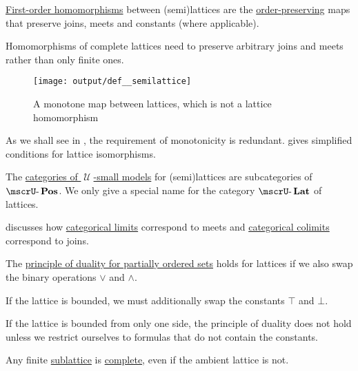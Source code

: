 \begin{definition}
\begin{thmenum}[resume=def:semilattice]
     \hyperref[def:first_order_homomorphism]{First-order homomorphisms} between (semi)lattices are the \hyperref[def:order_homomorphism/increasing]{order-preserving} maps that preserve joins, meets and constants (where applicable).

    Homomorphisms of complete lattices need to preserve arbitrary joins and meets rather than only finite ones.

    \begin{figure}[!ht]
      \centering
      \texttt{[image: output/def\_\_semilattice]}
      \caption{A monotone map between lattices, which is not a lattice homomorphism}
      \label{fig:def:semilattice/homomorphism/monotone_map_not_homomorphism}
    \end{figure}

    As we shall see in , the requirement of monotonicity is redundant.  gives simplified conditions for lattice isomorphisms.

     The \hyperref[def:category_of_small_first_order_models]{categories of \( \mscrU \)-small models} for (semi)lattices are subcategories of \hyperref[def:partially_ordered_set]{\( \ucat{Pos} \)}. We only give a special name for the category \( \ucat{Lat} \) of lattices.

     discusses how \hyperref[def:category_of_cones/limit]{categorical limits} correspond to meets and \hyperref[def:category_of_cones/colimit]{categorical colimits} correspond to joins.

     The \hyperref[thm:preorder_duality]{principle of duality for partially ordered sets} holds for lattices if we also swap the binary operations \( \vee \) and \( \wedge \).

    If the lattice is bounded, we must additionally swap the constants \( \top \) and \( \bot \).

    If the lattice is bounded from only one side, the principle of duality does not hold unless we restrict ourselves to formulas that do not contain the constants.
  \end{thmenum}
\end{definition}

\begin{example}\label{ex:complete_sublattice_of_incomplete_lattice}
  Any finite \hyperref[def:semilattice/submodel]{sublattice} is \hyperref[def:semilattice/complete]{complete}, even if the ambient lattice is not.
\end{example}


